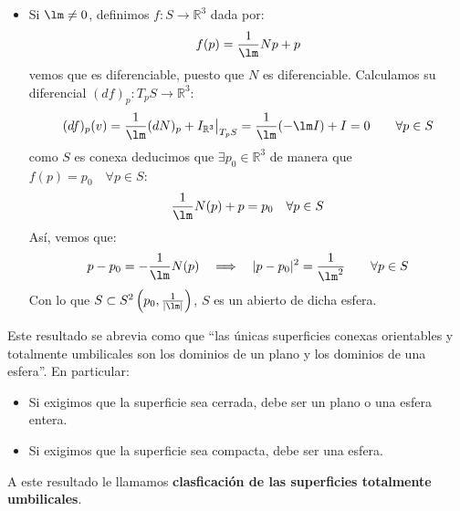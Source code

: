 \begin{ejercicio}
\begin{itemize}
            Así, tenemos que todas las rectas normales a $S$ son paralelas, con lo que por un ejercicio visto anteriormente, $S$ debe ser un abierto de un plano.
        \item Si $\lm\neq 0$, definimos $f:S\to\mathbb{R}^3$ dada por:
            \begin{equation*}
                f(p) = \frac{1}{\lm} Np + p
            \end{equation*}
            vemos que es diferenciable, puesto que $N$ es diferenciable. Calculamos su diferencial $(d f)_p:T_pS\to \mathbb{R}^3$:
            \begin{equation*}
                (d f)_p(v) = \frac{1}{\lm} (dN)_p + I_{\mathbb{R}^3}\big|_{T_pS} = \frac{1}{\lm}(-\lm I) + I = 0 \qquad \forall p\in S
            \end{equation*}
            como $S$ es conexa deducimos que $\exists p_0\in \mathbb{R}^3$ de manera que $f(p)=p_0\quad \forall p\in S$:
            \begin{equation*}
                \frac{1}{\lm}N(p) + p = p_0 \quad \forall p\in S
            \end{equation*}
            Así, vemos que:
            \begin{equation*}
            p-p_0 = -\frac{1}{\lm}N(p) \quad\Longrightarrow\quad |p-p_0|^2 = \frac{1}{\lm^2} \qquad \forall p\in S
            \end{equation*}
            Con lo que $S\subset S^2\left(p_0,\frac{1}{|\lm|}\right)$, $S$ es un abierto de dicha esfera.
    \end{itemize}
    Este resultado se abrevia como que ``las únicas superficies conexas orientables y totalmente umbilicales son los dominios de un plano y los dominios de una esfera''. En particular:
    \begin{itemize}
        \item Si exigimos que la superficie sea cerrada, debe ser un plano o una esfera entera.
        \item Si exigimos que la superficie sea compacta, debe ser una esfera.
    \end{itemize}
    A este resultado le llamamos \textbf{clasficación de las superficies totalmente umbilicales}. %
\end{ejercicio}

